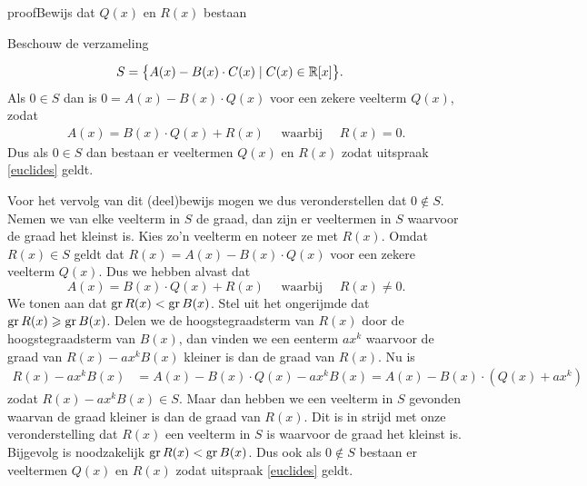 \documentclass{ximera}
\begin{document}
\begin{expandable}{proof}{Bewijs dat \(Q(x)\) en \(R(x)\) bestaan}
	
Beschouw de verzameling 

\begin{align*}
S & = \bigl\{ A(x) - B(x)\cdot C(x) \mid C(x) \in \mathbb{R}[x] \bigr\}.  
\end{align*}
Als \(0 \in S\) dan is \(0 = A(x) - B(x)\cdot Q(x)\) voor een zekere veelterm \(Q(x)\), zodat \begin{align*}
A(x) = B(x)\cdot Q(x) + R(x) \quad \text{ waarbij } \quad R(x) = 0.
\end{align*}
Dus als \(0 \in S\) dan bestaan er veeltermen \(Q(x)\) en \(R(x)\) zodat uitspraak \eqref{euclides} geldt. 

Voor het vervolg van dit (deel)bewijs mogen we dus veronderstellen dat \(0 \not\in S\). Nemen we van elke veelterm in \(S\) de graad, dan zijn er veeltermen in \(S\) waarvoor de graad het kleinst is. Kies zo'n veelterm en noteer ze met \(R(x)\). Omdat \(R(x) \in S\) geldt dat \(R(x) = A(x) - B(x)\cdot Q(x)\) voor een zekere veelterm \(Q(x)\). Dus we hebben alvast dat
\[
A(x) = B(x)\cdot Q(x) + R(x) \quad \text{ waarbij } \quad R(x) \neq 0.
\]
We tonen aan dat \(\operatorname{gr} R(x) < \operatorname{gr} B(x)\). Stel uit het ongerijmde dat \(\operatorname{gr} R(x) \geqslant \operatorname{gr} B(x)\). Delen we de hoogstegraadsterm van \(R(x)\) door de hoogstegraadsterm van \(B(x)\), dan vinden we een eenterm \(ax^k\) waarvoor de graad van \(R(x) - ax^k B(x)\) kleiner is dan de graad van \(R(x)\). Nu is
\begin{align*}
R(x) - ax^k B(x) & = A(x) - B(x)\cdot Q(x) - ax^k B(x) = A(x) - B(x)\cdot (Q(x) + ax^k) 
\end{align*}
zodat \(R(x) - ax^k B(x) \in S\). Maar dan hebben we een veelterm in \(S\) gevonden waarvan de graad kleiner is dan de graad van \(R(x)\). Dit is in strijd  met onze veronderstelling dat \(R(x)\) een veelterm in \(S\) is waarvoor de graad het kleinst is. Bijgevolg is noodzakelijk \(\operatorname{gr} R(x) < \operatorname{gr} B(x)\). Dus ook als \(0 \not\in S\) bestaan er veeltermen \(Q(x)\) en \(R(x)\) zodat uitspraak \eqref{euclides} geldt.

\end{expandable}
\end{document}
